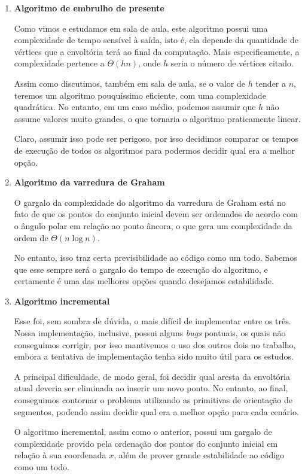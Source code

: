 \documentclass{article}
\begin{document}
\begin{enumerate}
	\item \textbf{Algoritmo de embrulho de presente}

	      Como vimos e estudamos em sala de aula, este algoritmo possui uma complexidade de tempo sensível à saída, isto é, ela depende da quantidade de vértices que a envoltória terá ao final da computação. Mais especificamente, a complexidade pertence a \( \Theta(hn) \), onde \( h \) seria o número de vértices citado.

	      Assim como discutimos, também em sala de aula, se o valor de \( h \) tender a \( n \), teremos um algoritmo pouquíssimo eficiente, com uma complexidade quadrática. No entanto, em um caso médio, podemos assumir que \( h \) não assume valores muito grandes, o que tornaria o algoritmo praticamente linear.

	      Claro, assumir isso pode ser perigoso, por isso decidimos comparar os tempos de execução de todos os algoritmos para podermos decidir qual era a melhor opção.

	\item \textbf{Algoritmo da varredura de Graham}

	      O gargalo da complexidade do algoritmo da varredura de Graham está no fato de que os pontos do conjunto inicial devem ser ordenados de acordo com o ângulo polar em relação ao ponto âncora, o que gera um complexidade da ordem de \( \Theta(n \log n) \).

	      No entanto, isso traz certa previsibilidade ao código como um todo. Sabemos que esse sempre será o gargalo do tempo de execução do algoritmo, e certamente é uma das melhores opções quando desejamos estabilidade.

	\item \textbf{Algoritmo incremental}

	      Esse foi, sem sombra de dúvida, o mais difícil de implementar entre os três. Nossa implementação, inclusive, possui alguns \textit{bugs} pontuais, os quais não conseguimos corrigir, por isso mantivemos o uso dos outros dois no trabalho, embora a tentativa de implementação tenha sido muito útil para os estudos.

	      A principal dificuldade, de modo geral, foi decidir qual aresta da envoltória atual deveria ser eliminada ao inserir um novo ponto. No entanto, ao final, conseguimos contornar o problema utilizando as primitivas de orientação de segmentos, podendo assim decidir qual era a melhor opção para cada cenário.

	      O algoritmo incremental, assim como o anterior, possui um gargalo de complexidade provido pela ordenação dos pontos do conjunto inicial em relação à sua coordenada \( x \), além de prover grande estabilidade ao código como um todo.
\end{enumerate}
\end{document}
